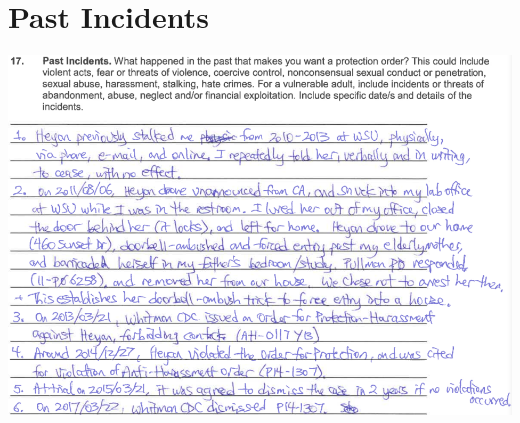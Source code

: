 \documentclass[9pt, b5paper]{article}
\begin{document}
\section{Past Incidents}
\label{sec-5}

\includegraphics[width=.9\linewidth]{./pic/dearCousin_20220919_183625.png}
\end{document}
